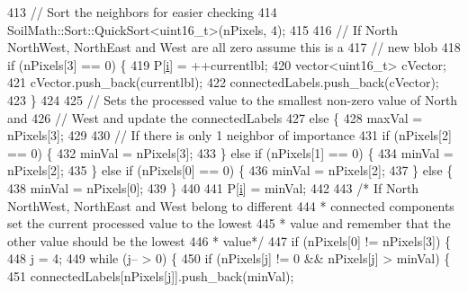 \begin{DoxyCode}
413         \textcolor{comment}{// Sort the neighbors for easier checking}
414         SoilMath::Sort::QuickSort<uint16\_t>(nPixels, 4);
415 
416         \textcolor{comment}{// If North NorthWest, NorthEast and West are all zero assume this is a}
417         \textcolor{comment}{// new blob}
418         \textcolor{keywordflow}{if} (nPixels[3] == 0) \{
419           P[\hyperlink{_comparision_pictures_2_createtest_image_8m_a6f6ccfcf58b31cb6412107d9d5281426}{i}] = ++currentlbl;
420           vector<uint16\_t> cVector;
421           cVector.push\_back(currentlbl);
422           connectedLabels.push\_back(cVector);
423         \}
424 
425         \textcolor{comment}{// Sets the processed value to the smallest non-zero value of North and}
426         \textcolor{comment}{// West and update the connectedLabels}
427         \textcolor{keywordflow}{else} \{
428           maxVal = nPixels[3];
429 
430           \textcolor{comment}{// If there is only 1 neighbor of importance}
431           \textcolor{keywordflow}{if} (nPixels[2] == 0) \{
432             minVal = nPixels[3];
433           \} \textcolor{keywordflow}{else} \textcolor{keywordflow}{if} (nPixels[1] == 0) \{
434             minVal = nPixels[2];
435           \} \textcolor{keywordflow}{else} \textcolor{keywordflow}{if} (nPixels[0] == 0) \{
436             minVal = nPixels[2];
437           \} \textcolor{keywordflow}{else} \{
438             minVal = nPixels[0];
439           \}
440 
441           P[\hyperlink{_comparision_pictures_2_createtest_image_8m_a6f6ccfcf58b31cb6412107d9d5281426}{i}] = minVal;
442 
443           \textcolor{comment}{/* If North NorthWest, NorthEast and West belong to different}
444 \textcolor{comment}{           * connected components set the current processed value to the lowest}
445 \textcolor{comment}{           * value and remember that the other value should be the lowest}
446 \textcolor{comment}{           * value*/}
447           \textcolor{keywordflow}{if} (nPixels[0] != nPixels[3]) \{
448             \hyperlink{_comparision_pictures_2_createtest_image_8m_ac86694252f8dfdb19aaeadc4b7c342c6}{j} = 4;
449             \textcolor{keywordflow}{while} (\hyperlink{_comparision_pictures_2_createtest_image_8m_ac86694252f8dfdb19aaeadc4b7c342c6}{j}-- > 0) \{
450               \textcolor{keywordflow}{if} (nPixels[\hyperlink{_comparision_pictures_2_createtest_image_8m_ac86694252f8dfdb19aaeadc4b7c342c6}{j}] != 0 && nPixels[\hyperlink{_comparision_pictures_2_createtest_image_8m_ac86694252f8dfdb19aaeadc4b7c342c6}{j}] > minVal) \{
451                 connectedLabels[nPixels[\hyperlink{_comparision_pictures_2_createtest_image_8m_ac86694252f8dfdb19aaeadc4b7c342c6}{j}]].push\_back(minVal);

\end{DoxyCode}
